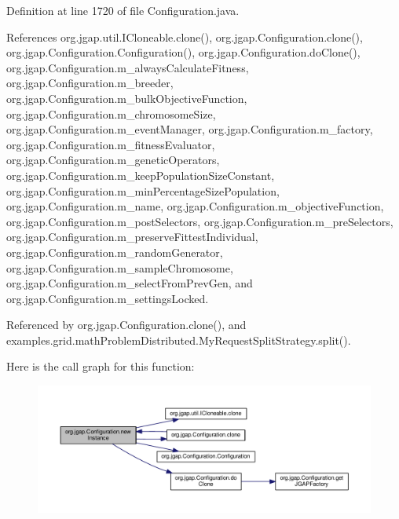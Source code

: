 Definition at line 1720 of file Configuration.\-java.



References org.\-jgap.\-util.\-I\-Cloneable.\-clone(), org.\-jgap.\-Configuration.\-clone(), org.\-jgap.\-Configuration.\-Configuration(), org.\-jgap.\-Configuration.\-do\-Clone(), org.\-jgap.\-Configuration.\-m\-\_\-always\-Calculate\-Fitness, org.\-jgap.\-Configuration.\-m\-\_\-breeder, org.\-jgap.\-Configuration.\-m\-\_\-bulk\-Objective\-Function, org.\-jgap.\-Configuration.\-m\-\_\-chromosome\-Size, org.\-jgap.\-Configuration.\-m\-\_\-event\-Manager, org.\-jgap.\-Configuration.\-m\-\_\-factory, org.\-jgap.\-Configuration.\-m\-\_\-fitness\-Evaluator, org.\-jgap.\-Configuration.\-m\-\_\-genetic\-Operators, org.\-jgap.\-Configuration.\-m\-\_\-keep\-Population\-Size\-Constant, org.\-jgap.\-Configuration.\-m\-\_\-min\-Percentage\-Size\-Population, org.\-jgap.\-Configuration.\-m\-\_\-name, org.\-jgap.\-Configuration.\-m\-\_\-objective\-Function, org.\-jgap.\-Configuration.\-m\-\_\-post\-Selectors, org.\-jgap.\-Configuration.\-m\-\_\-pre\-Selectors, org.\-jgap.\-Configuration.\-m\-\_\-preserve\-Fittest\-Individual, org.\-jgap.\-Configuration.\-m\-\_\-random\-Generator, org.\-jgap.\-Configuration.\-m\-\_\-sample\-Chromosome, org.\-jgap.\-Configuration.\-m\-\_\-select\-From\-Prev\-Gen, and org.\-jgap.\-Configuration.\-m\-\_\-settings\-Locked.



Referenced by org.\-jgap.\-Configuration.\-clone(), and examples.\-grid.\-math\-Problem\-Distributed.\-My\-Request\-Split\-Strategy.\-split().



Here is the call graph for this function\-:
\nopagebreak
\begin{figure}[H]
\begin{center}
\leavevmode
\includegraphics[width=350pt]{classorg_1_1jgap_1_1_configuration_a25b74c8bdc70a3b88d6d4080a00f1f29_cgraph}
\end{center}
\end{figure}


